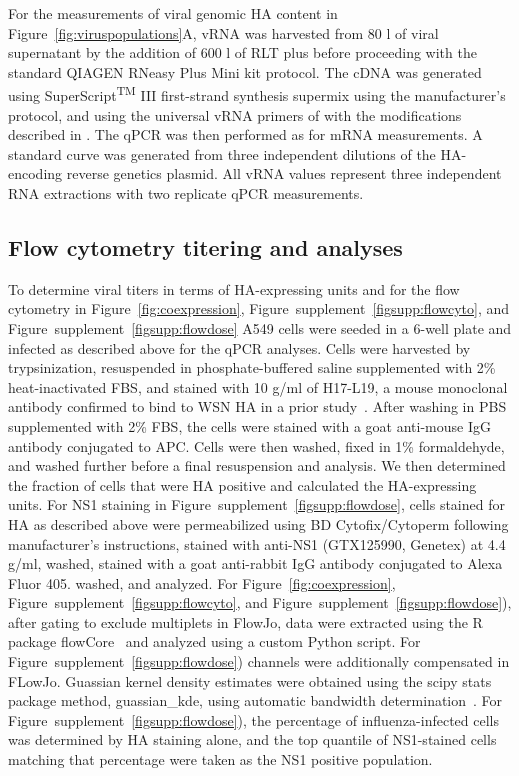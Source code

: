 \documentclass[9pt,lineno]{elife}
\begin{document}
For the measurements of viral genomic HA content in Figure~\ref{fig:viruspopulations}A, vRNA was harvested from 80 \si{\micro}l of viral supernatant by the addition of 600 \si{\micro}l of RLT plus before proceeding with the standard QIAGEN RNeasy Plus Mini kit protocol.
The cDNA was generated using SuperScript\textsuperscript{TM} III first-strand synthesis supermix using the manufacturer's protocol, and using the universal vRNA primers of \citet{Hoffmann:2001vj} with the modifications described in  \citet{Xue:2017dl}.
The qPCR was then performed as for mRNA measurements.
A standard curve was generated from three independent dilutions of the HA-encoding reverse genetics plasmid. 
All vRNA values represent three independent RNA extractions with two replicate qPCR measurements. 

\subsection{Flow cytometry titering and analyses}
To determine viral titers in terms of HA-expressing units and for the flow cytometry in Figure~\ref{fig:coexpression}, Figure~supplement~\ref{figsupp:flowcyto}, and Figure~supplement~\ref{figsupp:flowdose} A549 cells were seeded in a 6-well plate and infected as described above for the qPCR analyses.
Cells were harvested by trypsinization, resuspended in phosphate-buffered saline supplemented with 2\% heat-inactivated FBS, and stained with 10 \si{\micro}g/ml of H17-L19, a mouse monoclonal antibody confirmed to bind to WSN HA in a prior study~\citep{Doud:2017bw}.
After washing in PBS supplemented with 2\% FBS, the cells were stained with a goat anti-mouse IgG antibody conjugated to APC.
Cells were then washed, fixed in 1\% formaldehyde, and washed further before a final resuspension and analysis. 
We then determined the fraction of cells that were HA positive and calculated the HA-expressing units.
For NS1 staining in Figure~supplement~\ref{figsupp:flowdose}, cells stained for HA as described above were permeabilized using BD Cytofix/Cytoperm following manufacturer's instructions, stained with anti-NS1 (GTX125990, Genetex) at 4.4 \si{\micro}g/ml, washed,  stained with a  goat anti-rabbit IgG antibody conjugated to Alexa Fluor 405. washed, and analyzed.
For Figure~\ref{fig:coexpression}, Figure~supplement~\ref{figsupp:flowcyto}, and  Figure~supplement~\ref{figsupp:flowdose}), after gating to exclude multiplets in FlowJo, data were extracted using the R package flowCore~\citep{LeMeur:2007uo} and analyzed using a custom Python script.
For  Figure~supplement~\ref{figsupp:flowdose}) channels were additionally compensated in FLowJo.
Guassian kernel density estimates were obtained using the scipy stats package method, guassian\_kde, using automatic bandwidth determination~\citep{vanderWalt:2017dp}.
For Figure~supplement~\ref{figsupp:flowdose}), the percentage of influenza-infected cells was determined by HA staining alone, and the top quantile of NS1-stained cells matching that percentage were taken as the NS1 positive population.
\end{document}
